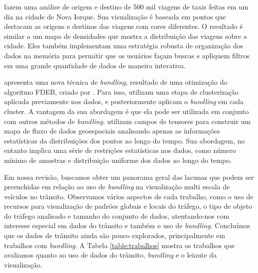 \citet{Ferreira2013} fazem uma análise de origem e destino de 500 mil viagens
de taxis feitas em um dia na cidade de Nova Iorque. Sua visualização é baseada
em pontos que destacam as origens e destinos das viagens com cores diferentes.
O resultado é similar a um mapa de densidades que mostra a distribuição das
viagens sobre a cidade. Eles também implementam uma estratégia robusta de
organização dos dados na memória para permitir que os usuários façam buscas e
apliquem filtros em uma grande quantidade de dados de maneira interativa. 

\citet{Anita2017} apresenta uma nova técnica de \emph{bundling}, resultado de
uma otimização do algoritmo FDEB, criado por \citet{Selassie2011}. Para isso,
utilizam uma etapa de clusterização aplicada previamente nos dados, e
posteriormente aplicam o \emph{bundling} em cada cluster. A vantagem da sua
abordagem é que ela pode ser utilizada em conjunto com outros métodos de
\emph{bundling}. \citet{Kim2018} utilizam campos de tensores para construir
um mapa de fluxo de dados geoespaciais analisando apenas as informações
estatísticas da distribuições dos pontos ao longo do tempo. Sua abordagem, no entanto
implica uma série de restrições estatísticas nos dados, como número mínimo 
de amostras e distribuição uniforme dos dados ao longo do tempo.

  Em nossa revisão, buscamos obter um panorama geral das lacunas que podem ser
preenchidas em relação ao uso de \emph{bundling} na visualização multi escala
de veículos no trânsito. Observamos vários aspectos de cada trabalho, como
o uso de recursos para visualização de padrões globais e locais do tráfego, o tipo de
objeto do tráfego analisado e tamanho do conjunto de dados, atentando-nos com interesse
especial em dados do trânsito e também o uso de \emph{bundling}. Concluímos que os dados de
trânsito ainda são pouco explorados, principalmente em trabalhos com
\emph{bundling}. A Tabela \ref{table:trabalhos} mostra os trabalhos que avaliamos
quanto ao uso de dados do trânsito, \emph{bundling} e o leiaute da visualização.


